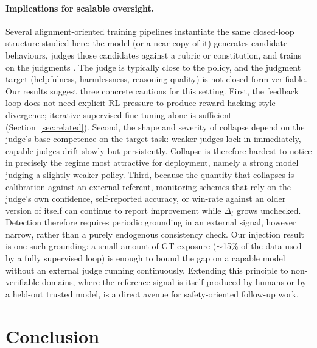 \documentclass{article}
\begin{document}
\paragraph{Implications for scalable oversight.}
Several alignment-oriented training pipelines instantiate the same closed-loop
structure studied here: the model (or a near-copy of it) generates candidate
behaviours, judges those candidates against a rubric or constitution, and
trains on the judgments \citep{bai2022constitutional}.
The judge is typically close to the policy, and the judgment target
(helpfulness, harmlessness, reasoning quality) is not closed-form verifiable.
Our results suggest three concrete cautions for this setting.
First, the feedback loop does not need explicit RL pressure to produce
reward-hacking-style divergence; iterative supervised fine-tuning alone is
sufficient (Section~\ref{sec:related}).
Second, the shape and severity of collapse depend on the judge's base
competence on the target task: weaker judges lock in immediately, capable
judges drift slowly but persistently.
Collapse is therefore hardest to notice in precisely the regime most
attractive for deployment, namely a strong model judging a slightly weaker
policy.
Third, because the quantity that collapses is calibration against an external
referent, monitoring schemes that rely on the judge's own confidence,
self-reported accuracy, or win-rate against an older version of itself can
continue to report improvement while $\Delta_t$ grows unchecked.
Detection therefore requires periodic grounding in an external signal,
however narrow, rather than a purely endogenous consistency check.
Our injection result is one such grounding: a small amount of GT exposure
($\sim$15\% of the data used by a fully supervised loop) is enough to bound
the gap on a capable model without an external judge running continuously.
Extending this principle to non-verifiable domains, where the reference
signal is itself produced by humans or by a held-out trusted model, is a
direct avenue for safety-oriented follow-up work.

\section{Conclusion}
\label{sec:conclusion}
\end{document}

